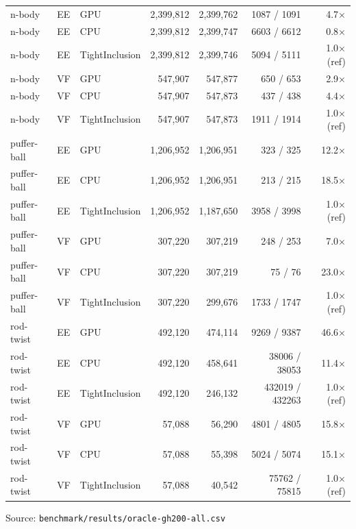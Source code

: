 \begin{table}[htbp]
{\begin{tabular}{lllrrrr}
    n-body & EE & GPU & 2,399,812 & 2,399,762 & 1087 / 1091 & 4.7× \\
    n-body & EE & CPU & 2,399,812 & 2,399,747 & 6603 / 6612 & 0.8× \\
    n-body & EE & TightInclusion & 2,399,812 & 2,399,746 & 5094 / 5111 & 1.0× (ref) \\
    n-body & VF & GPU & 547,907 & 547,877 & 650 / 653 & 2.9× \\
    n-body & VF & CPU & 547,907 & 547,873 & 437 / 438 & 4.4× \\
    n-body & VF & TightInclusion & 547,907 & 547,873 & 1911 / 1914 & 1.0× (ref) \\
    puffer-ball & EE & GPU & 1,206,952 & 1,206,951 & 323 / 325 & 12.2× \\
    puffer-ball & EE & CPU & 1,206,952 & 1,206,951 & 213 / 215 & 18.5× \\
    puffer-ball & EE & TightInclusion & 1,206,952 & 1,187,650 & 3958 / 3998 & 1.0× (ref) \\
    puffer-ball & VF & GPU & 307,220 & 307,219 & 248 / 253 & 7.0× \\
    puffer-ball & VF & CPU & 307,220 & 307,219 & 75 / 76 & 23.0× \\
    puffer-ball & VF & TightInclusion & 307,220 & 299,676 & 1733 / 1747 & 1.0× (ref) \\
    rod-twist & EE & GPU & 492,120 & 474,114 & 9269 / 9387 & 46.6× \\
    rod-twist & EE & CPU & 492,120 & 458,641 & 38006 / 38053 & 11.4× \\
    rod-twist & EE & TightInclusion & 492,120 & 246,132 & 432019 / 432263 & 1.0× (ref) \\
    rod-twist & VF & GPU & 57,088 & 56,290 & 4801 / 4805 & 15.8× \\
    rod-twist & VF & CPU & 57,088 & 55,398 & 5024 / 5074 & 15.1× \\
    rod-twist & VF & TightInclusion & 57,088 & 40,542 & 75762 / 75815 & 1.0× (ref) \\
    \bottomrule
  \end{tabular}}
  \par\smallskip\footnotesize Source: \texttt{benchmark/results/oracle-gh200-all.csv}
\end{table}
